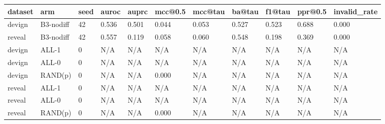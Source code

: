 \begin{tabular}{lllllllllll}
\toprule
dataset & arm & seed & auroc & auprc & mcc@0.5 & mcc@tau & ba@tau & f1@tau & ppr@0.5 & invalid\_rate \\
\midrule
devign & B3-nodiff & 42 & 0.536 & 0.501 & 0.044 & 0.053 & 0.527 & 0.523 & 0.688 & 0.000 \\
reveal & B3-nodiff & 42 & 0.557 & 0.119 & 0.058 & 0.060 & 0.548 & 0.198 & 0.369 & 0.000 \\
devign & ALL-1 & 0 & N/A & N/A & N/A & N/A & N/A & N/A & N/A & N/A \\
devign & ALL-0 & 0 & N/A & N/A & N/A & N/A & N/A & N/A & N/A & N/A \\
devign & RAND(p) & 0 & N/A & N/A & 0.000 & N/A & N/A & N/A & N/A & N/A \\
reveal & ALL-1 & 0 & N/A & N/A & N/A & N/A & N/A & N/A & N/A & N/A \\
reveal & ALL-0 & 0 & N/A & N/A & N/A & N/A & N/A & N/A & N/A & N/A \\
reveal & RAND(p) & 0 & N/A & N/A & 0.000 & N/A & N/A & N/A & N/A & N/A \\
\bottomrule
\end{tabular}